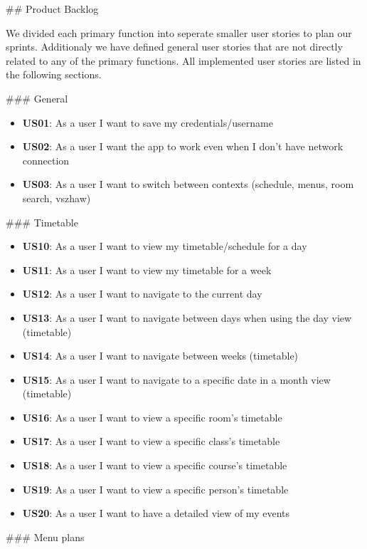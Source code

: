 \begin{markdown}
\newpage

## Product Backlog

We divided each primary function into seperate smaller user stories to plan our sprints. Additionaly we have defined general user stories that are not directly related to any of the primary functions. All implemented user stories are listed in the following sections.

### General

\begin{itemize}
  \item \textbf{US01}: As a user I want to save my credentials/username
  \item \textbf{US02}: As a user I want the app to work even when I don't have network connection
  \item \textbf{US03}: As a user I want to switch between contexts (schedule, menus, room search, vszhaw)
\end{itemize}

### Timetable

\begin{itemize}
  \item \textbf{US10}: As a user I want to view my timetable/schedule for a day
  \item \textbf{US11}: As a user I want to view my timetable for a week
  \item \textbf{US12}: As a user I want to navigate to the current day
  \item \textbf{US13}: As a user I want to navigate between days when using the day view (timetable)
  \item \textbf{US14}: As a user I want to navigate between weeks (timetable)
  \item \textbf{US15}: As a user I want to navigate to a specific date in a month view (timetable)
  \item \textbf{US16}: As a user I want to view a specific room's timetable
  \item \textbf{US17}: As a user I want to view a specific class's timetable
  \item \textbf{US18}: As a user I want to view a specific course's timetable
  \item \textbf{US19}: As a user I want to view a specific person's timetable
  \item \textbf{US20}: As a user I want to have a detailed view of my events
\end{itemize}

### Menu plans


\end{markdown}
